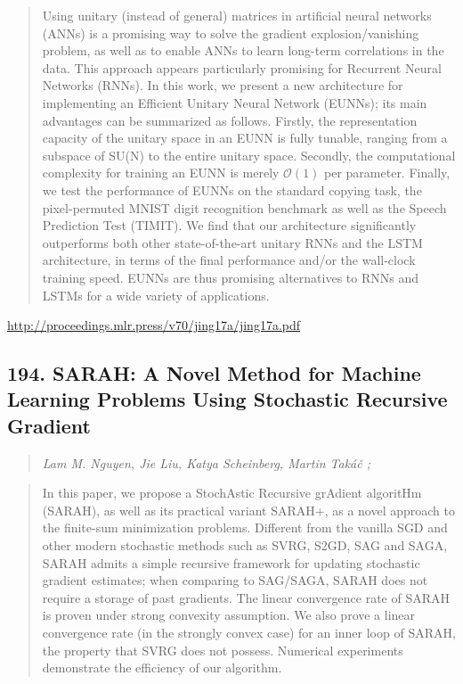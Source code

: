 \documentclass{article}
\begin{document}
\begin{quote}
    Using unitary (instead of general) matrices in artificial neural networks (ANNs) is a promising way to solve the gradient explosion/vanishing problem, as well as to enable ANNs to learn long-term correlations in the data. This approach appears particularly promising for Recurrent Neural Networks (RNNs). In this work, we present a new architecture for implementing an Efficient Unitary Neural Network (EUNNs); its main advantages can be summarized as follows. Firstly, the representation capacity of the unitary space in an EUNN is fully tunable, ranging from a subspace of SU(N) to the entire unitary space. Secondly, the computational complexity for training an EUNN is merely $\mathcal{O}(1)$ per parameter. Finally, we test the performance of EUNNs on the standard copying task, the pixel-permuted MNIST digit recognition benchmark as well as the Speech Prediction Test (TIMIT). We find that our architecture significantly outperforms both other state-of-the-art unitary RNNs and the LSTM architecture, in terms of the final performance and/or the wall-clock training speed. EUNNs are thus promising alternatives to RNNs and LSTMs for a wide variety of applications.  \end{quote}

\href{http://proceedings.mlr.press/v70/jing17a/jing17a.pdf}{http://proceedings.mlr.press/v70/jing17a/jing17a.pdf}

\subsection{194. SARAH: A Novel Method for Machine Learning Problems Using Stochastic Recursive Gradient}

\begin{quote}
\footnotesize{\textit{Lam M. Nguyen, Jie Liu, Katya Scheinberg, Martin Takáč ;}}
\end{quote}

\begin{quote}
    In this paper, we propose a StochAstic Recursive grAdient algoritHm (SARAH), as well as its practical variant SARAH+, as a novel approach to the finite-sum minimization problems. Different from the vanilla SGD and other modern stochastic methods such as SVRG, S2GD, SAG and SAGA, SARAH admits a simple recursive framework for updating stochastic gradient estimates; when comparing to SAG/SAGA, SARAH does not require a storage of past gradients. The linear convergence rate of SARAH is proven under strong convexity assumption. We also prove a linear convergence rate (in the strongly convex case) for an inner loop of SARAH, the property that SVRG does not possess. Numerical experiments demonstrate the efficiency of our algorithm.  \end{quote}
\end{document}
